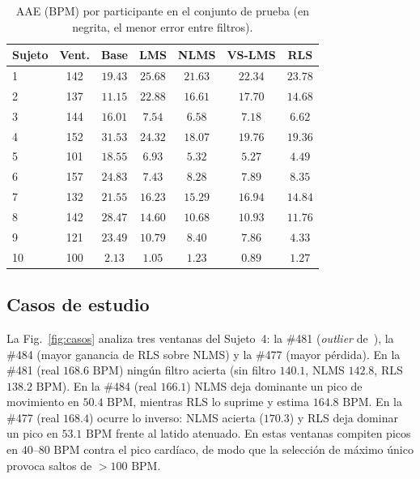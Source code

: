 \documentclass[conference]{IEEEtran}
\begin{document}
\begin{table}[!t]
    \centering
    \caption{AAE (BPM) por participante en el conjunto de prueba (en negrita, el menor error entre filtros).}
    \label{tab:test_subjects}
    \footnotesize
    \setlength{\tabcolsep}{3pt}
    \begin{tabular}{lcccccc}
        \toprule
        \textbf{Sujeto} & \textbf{Vent.} & \textbf{Base} & \textbf{LMS} & \textbf{NLMS} & \textbf{VS-LMS} & \textbf{RLS} \\
        \midrule
        1 & 142 & $19.43$ & $25.68$ & $\mathbf{21.63}$ & $22.34$ & $23.78$ \\
        2 & 137 & $11.15$ & $22.88$ & $16.61$ & $17.70$ & $\mathbf{14.68}$ \\
        3 & 144 & $16.01$ & $7.54$ & $\mathbf{6.58}$ & $7.18$ & $6.62$ \\
        4 & 152 & $31.53$ & $24.32$ & $\mathbf{18.07}$ & $19.76$ & $19.36$ \\
        5 & 101 & $18.55$ & $6.93$ & $5.32$ & $5.27$ & $\mathbf{4.49}$ \\
        6 & 157 & $24.83$ & $\mathbf{7.43}$ & $8.28$ & $7.89$ & $8.35$ \\
        7 & 132 & $21.55$ & $16.23$ & $15.29$ & $16.94$ & $\mathbf{14.84}$ \\
        8 & 142 & $28.47$ & $14.60$ & $\mathbf{10.68}$ & $10.93$ & $11.76$ \\
        9 & 121 & $23.49$ & $10.79$ & $8.40$ & $7.86$ & $\mathbf{4.33}$ \\
        10 & 100 & $2.13$ & $1.05$ & $1.23$ & $\mathbf{0.89}$ & $1.27$ \\
        \bottomrule
    \end{tabular}
\end{table}

\subsection{Casos de estudio}
\label{sec:res_casos}

La Fig.~\ref{fig:casos} analiza tres ventanas del Sujeto~4: la \#481 (\textit{outlier} de~\cite{informe1}), la \#484 (mayor ganancia de RLS sobre NLMS) y la \#477 (mayor pérdida). En la \#481 (real $168.6\text{ BPM}$) ningún filtro acierta (sin filtro $140.1$, NLMS $142.8$, RLS $138.2\text{ BPM}$). En la \#484 (real $166.1$) NLMS deja dominante un pico de movimiento en $50.4\text{ BPM}$, mientras RLS lo suprime y estima $164.8\text{ BPM}$. En la \#477 (real $168.4$) ocurre lo inverso: NLMS acierta ($170.3$) y RLS deja dominar un pico en $53.1\text{ BPM}$ frente al latido atenuado. En estas ventanas compiten picos en $40$--$80\text{ BPM}$ contra el pico cardíaco, de modo que la selección de máximo único provoca saltos de $>100\text{ BPM}$.
\end{document}
